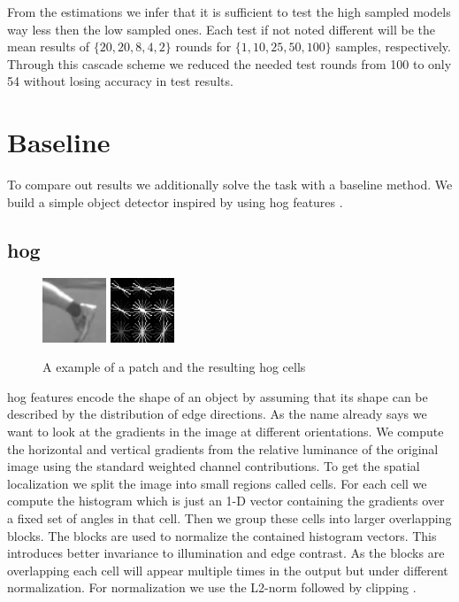 From the estimations  we infer that it is sufficient to test the high sampled models way less then the low sampled ones. Each test if not noted different will be the mean results of $\{20, 20, 8, 4, 2\}$ rounds for $\{1, 10, 25, 50, 100\}$ samples, respectively. Through this cascade scheme we reduced the needed test rounds from 100 to only 54 without losing accuracy in test results.


\section{Baseline}
\label{sec:results:baseline}
To compare out results we additionally solve the task with a baseline method. We build a simple object detector inspired by \citet{felzenszwalb_object_2010} using \gls{hog} features \citep{dalal_histograms_2005}.\\

\subsection{\Gls{hog}}
\begin{figure}
  \vspace{-25pt}
  \begin{center}
    \includegraphics[width=0.17\textwidth]{figures/hog_image.png}
    \includegraphics[width=0.17\textwidth]{figures/hog_feature.png}
  \end{center}
  \vspace{-5pt}
  \caption{A example of a patch and  the resulting \gls{hog} cells}
  \vspace{-10pt}
  \label{fig:hog}
\end{figure}
\gls{hog} features encode the shape of an object by assuming that its shape can be described by the distribution of edge directions. As the name already says we want to look at the gradients in the image at different orientations. We compute the horizontal and vertical gradients from the relative luminance of the original image using the standard weighted channel contributions. To get the spatial localization we split the image into small regions called cells. For each cell we compute the histogram which is just an 1-D vector containing the gradients over a fixed set of angles in that cell. Then we group these cells into larger overlapping blocks. The blocks are used to normalize the contained histogram vectors. This introduces better invariance to illumination and edge contrast. As the blocks are overlapping each cell will appear multiple times in the output but under different normalization. For normalization we use the L2-norm followed by clipping \citep{lowe_distinctive_2004}.

